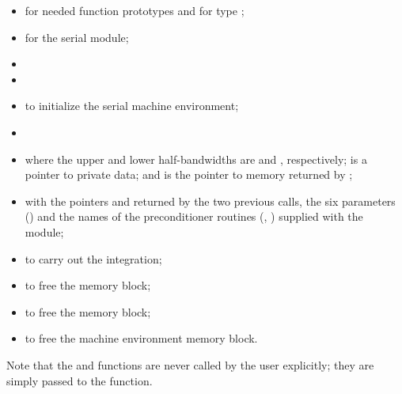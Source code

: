 \begin{itemize}
  \item {} 
    for needed function prototypes and for type ;

  \item {} 
    for the serial {\nvector} module;

  \item {}

  \item {}

  \item {} 
    to initialize the serial machine environment;

  \item {}

  \item {}

    where the upper and lower half-bandwidths are  and ,
    respectively;  is a pointer to private data; and 
    is the pointer to {\cvodes} memory returned by ;
    
  \item {}
    \newline\hspace*{1in}
    \newline\hspace*{1in}

    with the pointers  and  returned by the two previous calls, 
    the six {\spgmr} parameters () and 
    the names of the preconditioner routines (, ) supplied 
    with the {\cvbandpre} module;

  \item {}
    to carry out the integration;

  \item {}
        to free the {\cvbandpre} memory block;

  \item  {} 
    to free the {\cvodes} memory block;

  \item {}
    to free the machine environment memory block.

\end{itemize}
Note that the  and  functions are never called 
by the user explicitly; they are simply passed to the  function.

